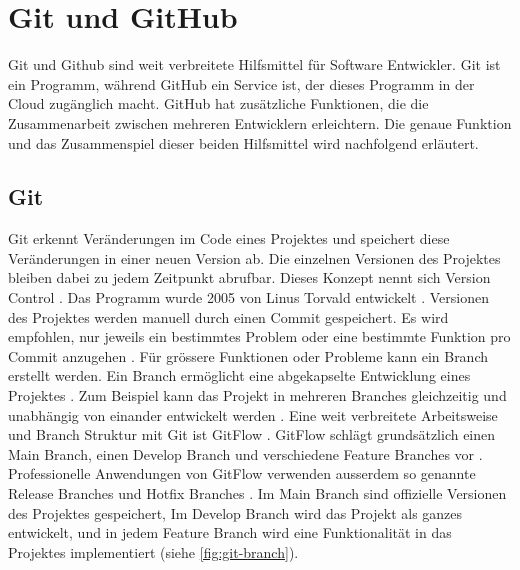\section{Git und GitHub}\label{chap:t_git} Git und Github sind weit verbreitete
Hilfsmittel für Software Entwickler. Git ist ein Programm, während GitHub ein
Service ist, der dieses Programm in der Cloud zugänglich macht. GitHub hat
zusätzliche Funktionen, die die Zusammenarbeit zwischen mehreren Entwicklern
erleichtern. Die genaue Funktion und das Zusammenspiel dieser beiden Hilfsmittel
wird nachfolgend erläutert.

\subsection{Git}\label{sub:t_git_git} Git erkennt Veränderungen im Code eines
Projektes und speichert diese Veränderungen in einer neuen Version ab. Die
einzelnen Versionen des Projektes bleiben dabei zu jedem Zeitpunkt abrufbar.
Dieses Konzept nennt sich Version Control
\cite{atlassian_git-flow-workflow_nodate}. Das Programm wurde 2005 von Linus
Torvald entwickelt \cite{noauthor_git_2021}. Versionen des Projektes werden
manuell durch einen Commit gespeichert. Es wird empfohlen, nur jeweils ein
bestimmtes Problem oder eine bestimmte Funktion pro Commit anzugehen
\cite{noauthor_5_2019}. Für grössere Funktionen oder Probleme kann ein Branch
erstellt werden. Ein Branch ermöglicht eine abgekapselte Entwicklung eines
Projektes \cite{guillermo_brachetta_what_2022}. Zum Beispiel kann das Projekt in
mehreren Branches gleichzeitig und unabhängig von einander entwickelt werden
\cite{guillermo_brachetta_what_2022}. Eine weit verbreitete Arbeitsweise und
Branch Struktur mit Git ist GitFlow
\cite{noauthor_what_2022}\cite{atlassian_git-flow-workflow_nodate}. GitFlow
schlägt grundsätzlich einen Main Branch, einen Develop Branch und verschiedene
Feature Branches vor \cite{atlassian_git-flow-workflow_nodate}. Professionelle
Anwendungen von GitFlow verwenden ausserdem so genannte Release Branches und
Hotfix Branches \cite{cameron_mckenzie_gitflow_2021}. Im Main Branch sind
offizielle Versionen des Projektes gespeichert, Im Develop Branch wird das
Projekt als ganzes entwickelt, und in jedem Feature Branch wird eine
Funktionalität in das Projektes implementiert (siehe \autoref{fig:git-branch}). 

